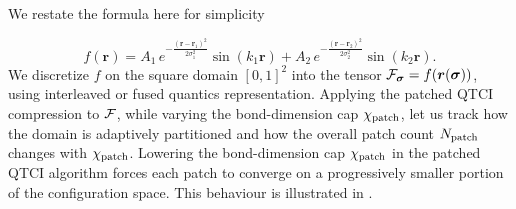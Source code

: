 We restate the formula here for simplicity

\begin{equation*}
		f(\boldsymbol{r}) = A_1\,e^{-\frac{(\boldsymbol{r} - \boldsymbol{r}_1)^2}{2\sigma^2_1}} \sin(k_1\boldsymbol{r}) + A_2\,e^{-\frac{(\boldsymbol{r} - \boldsymbol{r}_2)^2}{2\sigma^2_2}} \sin(k_2\boldsymbol{r}). 
\end{equation*}
We discretize $f$ on the square domain $[0,1]^2$ into the tensor $\mathcal{F}_{\boldsymbol{\sigma}} = f(\boldsymbol{r}(\boldsymbol{\sigma}))$, using interleaved or fused quantics representation. Applying the patched QTCI compression to $\mathcal{F}$, while varying the bond-dimension cap $\chi_{\text{patch}}$, let us track how the domain is adaptively partitioned and how the overall patch count $N_{\text{patch}}$ changes with $\chi_{\text{patch}}$. 
Lowering the bond-dimension cap $\chi_{\text{patch}}$ in the patched QTCI algorithm forces each patch to converge on a progressively smaller portion of the configuration space. This behaviour is illustrated in . 

